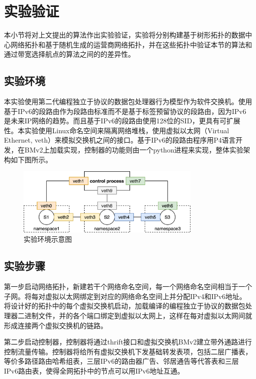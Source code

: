
\section{实验验证}

本小节将对上文提出的算法作出实验验证，实验将分别构建基于树形拓扑的数据中心网络拓扑和基于随机生成的运营商网络拓扑，并在这些拓扑中验证本节的算法和通过带宽选择航点的算法之间的的差异性。

\subsection{实验环境}

本实验使用第二代编程独立于协议的数据包处理器行为模型作为软件交换机。使用基于IPv6的段路由作为段路由标准而不是基于标签预留协议的段路由，因为IPv6是未来IP网络的趋势。而且基于IPv6的段路由使用128位的SID，更具有可扩展性。本实验使用Linux命名空间来隔离网络堆栈，使用虚拟以太网（Virtual Ethernet, veth）来模拟交换机之间的接口。基于IPv6的段路由程序用P4语言开发，在BMv2上加载实现，控制器的功能则由一个python进程来实现，整体实验架构如下图所示。

\begin{figure}[htbp]
\setlength{\abovecaptionskip}{15pt plus 3pt minus 2pt}
\centerline{\includegraphics[width=0.8\textwidth]{./figures/ch3-test-env.png}}
\caption{实验环境示意图}
\label{fig-ch3-test-env}
\end{figure}

\subsection{实验步骤}

第一步启动网络拓扑，新建若干个网络命名空间，每一个网络命名空间相当于一个子网。将每对虚拟以太网绑定到对应的网络命名空间上并分配IPv4和IPv6地址。将设计好的拓扑中的每个虚拟交换机启动，加载编译的编程独立于协议的数据包处理器二进制文件，并的各个端口绑定到虚拟以太网上，这样在每对虚拟以太网间就形成连接两个虚拟交换机的链路。

第二步启动控制器，控制器将通过thrift接口和虚拟交换机BMv2建立带外通路进行控制流量传输。控制器将给所有虚拟交换机下发基础转发表项，包括二层广播表，等价多路径路由哈希组表，三层IPv6的路由器广告、邻居通告等代答表和三层IPv6路由表，使得全网拓扑中的节点可以用IPv6地址互通。

